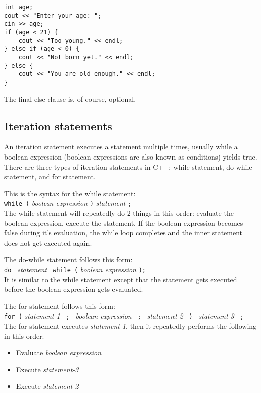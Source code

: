 \documentclass[a4paper,12pt]{article}
\begin{document}
\begin{lstlisting}
int age;
cout << "Enter your age: ";
cin >> age;
if (age < 21) {
	cout << "Too young." << endl;
} else if (age < 0) {
	cout << "Not born yet." << endl;
} else {
	cout << "You are old enough." << endl;
}
\end{lstlisting}

The final else clause is, of course, optional.

\subsection*{Iteration statements}

An iteration statement executes a statement multiple times, usually while a boolean expression (boolean expressions are also known as conditions) yields true. There are three types of iteration statements in C++: while statement, do-while statement, and for statement.

This is the syntax for the while statement: \\

\texttt{while (} \textit{boolean expression} \texttt{)} \textit{statement} \texttt{;} \\

The while statement will repeatedly do 2 things in this order: evaluate the boolean expression, execute the statement. If the boolean expression becomes false during it's evaluation, the while loop completes and the inner statement does not get executed again.

The do-while statement follows this form: \\

\texttt{do } \textit{statement} \texttt{ while (} \textit{boolean expression} \texttt{);} \\

It is similar to the while statement except that the statement gets executed before the boolean expression gets evaluated.

The for statement follows this form: \\

\texttt{for (} \textit{statement-1} \texttt{ ; } \textit{boolean expression} \texttt{ ; } \textit{statement-2} \texttt{ ) } \textit{statement-3} \texttt{ ;} \\

The for statement executes \textit{statement-1}, then it repeatedly performs the following in this order:

\begin{itemize}
\item Evaluate \textit{boolean expression}
\item Execute \textit{statement-3}
\item Execute \textit{statement-2}
\end{itemize}
\end{document}
